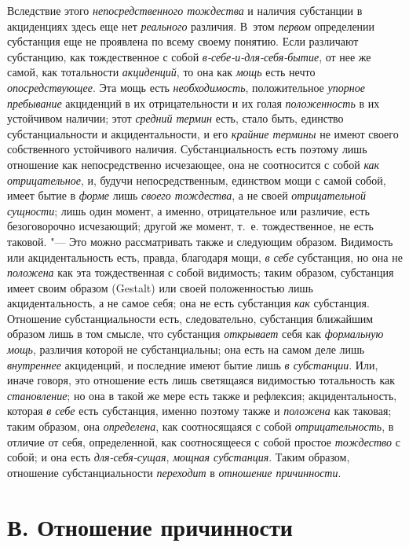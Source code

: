 Вследствие этого {\em непосредственного тождества} и
наличия субстанции в акциденциях здесь еще нет
{\em реального} различия. В~этом
{\em первом} определении субстанция еще не проявлена по
всему своему понятию. Если различают субстанцию, как тождественное с собой
{\em в-себе-и-для-себя-бытие}, от нее же самой, как
тотальности {\em акциденций}, то она как
{\em мощь} есть нечто
{\em опосредствующее}. Эта мощь есть
{\em необходимость}, положительное
{\em упорное пребывание} акциденций в их
отрицательности и их голая {\em положенность} в их
устойчивом наличии; этот {\em средний термин} есть,
стало быть, единство субстанциальности и акцидентальности, и его
{\em крайние термины} не имеют своего собственного
устойчивого наличия. Субстанциальность есть поэтому лишь отношение как
непосредственно исчезающее, она не соотносится с собой
{\em как отрицательное}, и, будучи непосредственным,
единством мощи с самой собой, имеет бытие в {\em форме}
лишь {\em своего тождества}, а не своей
{\em отрицательной сущности}; лишь один момент, а
именно, отрицательное или различие, есть безоговорочно исчезающий; другой
же момент, т.~е. тождественное, не есть таковой. "--- Это можно рассматривать
также и следующим образом. Видимость или акцидентальность есть, правда,
благодаря мощи, {\em в себе} субстанция, но она не
{\em положена} как эта тождественная с собой видимость;
таким образом, субстанция имеет своим образом (Gestalt) или своей
положенностью лишь акцидентальность, а не самое себя; она не есть
субстанция {\em как} субстанция. Отношение
субстанциальности есть, следовательно, субстанция ближайшим образом лишь в
том смысле, что субстанция {\em открывает} себя как
{\em формальную мощь}, различия которой не
субстанциальны; она есть на самом деле лишь
{\em внутреннее} акциденций, и последние имеют бытие
лишь {\em в субстанции}. Или, иначе говоря, это
отношение есть лишь светящаяся видимостью тотальность как
{\em становление}; но она в такой же мере есть также и
рефлексия; акцидентальность, которая {\em в себе} есть
субстанция, именно поэтому также и {\em положена} как
таковая; таким образом, она {\em определена}, как
соотносящаяся с собой {\em отрицательность}, в отличие
от себя, определенной, как соотносящееся с собой простое
{\em тождество} с собой; и она есть {\em для-себя-сущая}, {\em мощная
субстанция}. Таким образом, отношение субстанциальности
{\em переходит} в {\em отношение причинности}.


\section[В. Отношение причинности]{В. Отношение причинности}

